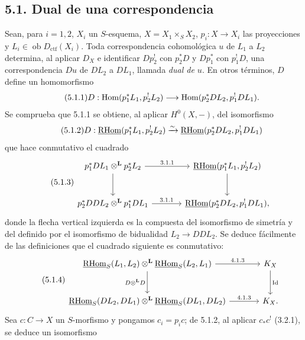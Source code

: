 \subsection*{5.1. Dual de una correspondencia}

Sean, para $i=1,2$, $X_i$ un $S$-esquema, $X=X_1\times_S X_2$, $p_i:X\to X_i$ las proyecciones y $L_i\in\operatorname{ob}D_{\mathrm{ctf}}(X_i)$. Toda correspondencia cohomológica $u$ de $L_1$ a $L_2$ determina, al aplicar $D_X$ e identificar $Dp_2^!$ con $p_2^*D$ y $Dp_1^*$ con $p_1^!D$, una correspondencia $Du$ de $DL_2$ a $DL_1$, llamada \emph{dual de $u$}. En otros términos, $D$ define un homomorfismo
\begin{equation}
\tag{5.1.1}
D:\operatorname{Hom}(p_1^*L_1,p_2^!L_2)\longrightarrow \operatorname{Hom}(p_2^*DL_2,p_1^!DL_1).
\end{equation}
Se comprueba que 5.1.1 se obtiene, al aplicar $H^0(X,-)$, del isomorfismo
\begin{equation}
\tag{5.1.2}
D:\underline{\mathrm{RHom}}(p_1^*L_1,p_2^!L_2)\xrightarrow{\sim}\underline{\mathrm{RHom}}(p_2^*DL_2,p_1^!DL_1)
\end{equation}
que hace conmutativo el cuadrado
\begin{equation}
\tag{5.1.3}
\begin{tikzcd}[column sep=large,row sep=large]
p_1^*DL_1\otimes^{\mathbf L}p_2^*L_2 \arrow[r,"3.1.1"] \arrow[d]
& \uRHom(p_1^*L_1,p_2^!L_2) \arrow[d] \\
p_2^*DDL_2\otimes^{\mathbf L}p_1^*DL_1 \arrow[r,"3.1.1"]
& \uRHom(p_2^*DL_2,p_1^!DL_1),
\end{tikzcd}
\end{equation}
donde la flecha vertical izquierda es la compuesta del isomorfismo de simetría y del definido por el isomorfismo de bidualidad $L_2\to DDL_2$. Se deduce fácilmente de las definiciones que el cuadrado siguiente es conmutativo:
\begin{equation}
\tag{5.1.4}
\begin{tikzcd}[column sep=large,row sep=large]
\uRHom_S(L_1,L_2)\otimes^{\mathbf L}\uRHom_S(L_2,L_1) \arrow[r,"4.1.3"] \arrow[d,"D\otimes^{\mathbf L} D"']
& K_X \arrow[d,"\operatorname{Id}"] \\
\uRHom_S(DL_2,DL_1)\otimes^{\mathbf L}\uRHom_S(DL_1,DL_2) \arrow[r,"4.1.3"]
& K_X.
\end{tikzcd}
\end{equation}
Sea $c:C\to X$ un $S$-morfismo y pongamos $c_i=p_ic$; de 5.1.2, al aplicar $c_*c^!$ (3.2.1), se deduce un isomorfismo
